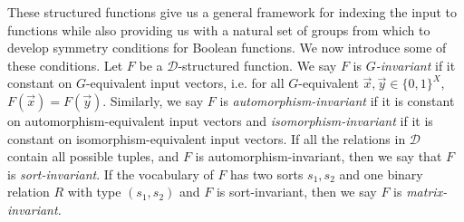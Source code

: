 \documentclass[../paper.tex]{subfiles}
\begin{document}



These structured functions give us a general framework for indexing the input to
functions while also providing us with a natural set of groups from which to
develop symmetry conditions for Boolean functions. We now introduce some of
these conditions. Let $F$ be a $\mathcal{D}$-structured function. We say $F$ is
\emph{$G$-invariant} if it constant on $G$-equivalent input vectors, i.e. for
all $G$-equivalent $\vec{x},\vec{y} \in \{0,1\}^{X}$, $F(\vec{x}) = F(\vec{y})$.
Similarly, we say $F$ is \emph{automorphism-invariant} if it is constant on
automorphism-equivalent input vectors and \emph{isomorphism-invariant} if it is
constant on isomorphism-equivalent input vectors. If all the relations in
$\mathcal{D}$ contain all possible tuples, and $F$ is automorphism-invariant,
then we say that $F$ is \emph{sort-invariant}. If the vocabulary of $F$ has two
sorts $s_1, s_2$ and one binary relation $R$ with type $(s_1, s_2)$ and $F$ is
sort-invariant, then we say $F$ is \emph{matrix-invariant}.
\end{document}

